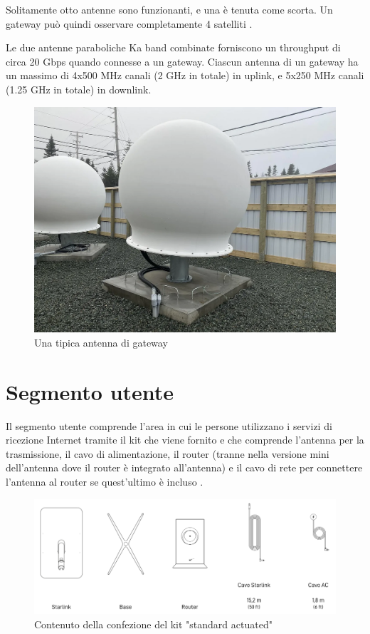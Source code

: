 Solitamente otto antenne sono funzionanti, e una è tenuta come scorta.
Un gateway può quindi osservare completamente 4 satelliti \cite{mike_puchol_modeling_2022}.

Le due antenne paraboliche \ac{Ka} band combinate forniscono un throughput di circa 20 Gbps quando connesse a un gateway.
Ciascun antenna di un gateway ha un massimo di 4x500 MHz canali (2 GHz in totale) in uplink, e 5x250 MHz canali (1.25 GHz in totale) in downlink.

\begin{figure}[htbp]
  \centering
  \includegraphics[width=0.9\linewidth]{./res/img/starlink_gateway_near.png}
  \caption{Una tipica antenna di gateway \cite{mike_puchol_modeling_2022}}
  \label{fig:starlink-gateway-near}
\end{figure}

\section{Segmento utente}
Il segmento utente comprende l'area in cui le persone utilizzano i servizi di ricezione Internet tramite il kit che viene fornito e che comprende l'antenna per la trasmissione, il cavo di alimentazione, il router (tranne nella versione mini dell'antenna dove il router è integrato all'antenna) e il cavo di rete per connettere l'antenna al router se quest'ultimo è incluso \cite{branch_education_how_2022}.

\begin{figure}[htbp]
  \centering
  \includegraphics[width=0.8\linewidth]{./res/img/starlink_kit_standard.png}
  \caption{Contenuto della confezione del kit "standard actuated" \cite{starlink_specifiche_nodate}}
  \label{fig:starlink-kit-standard}
\end{figure}

